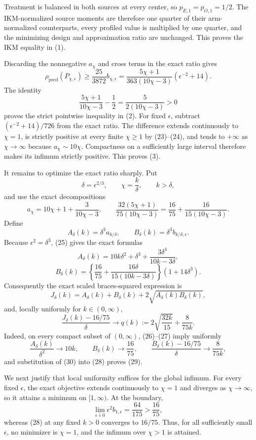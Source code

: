 Treatment is balanced in both sources at every center, so \(p_{E,1}=p_{O,1}=1/2\). The IKM-normalized source moments are therefore one quarter of their arm-normalized counterparts, every profiled value is multiplied by one quarter, and the minimizing design and approximation ratio are unchanged. This proves the IKM equality in (1).

Discarding the nonnegative \(a_\chi\) and cross terms in the exact ratio gives
\[
 \rho_{\mathrm{pred}}(P_{\chi,\epsilon})
 \ge \frac{25}{3872}b_{\chi,\epsilon}
 =\frac{5\chi+1}{363(10\chi-3)}(\epsilon^{-2}+14).     \tag{23}
\]
The identity
\[
 \frac{5\chi+1}{10\chi-3}-\frac12
 =\frac5{2(10\chi-3)}>0                                \tag{24}
\]
proves the strict pointwise inequality in (2). For fixed \(\epsilon\), subtract \((\epsilon^{-2}+14)/726\) from the exact ratio. The difference extends continuously to \(\chi=1\), is strictly positive at every finite \(\chi\ge1\) by (23)--(24), and tends to \(+\infty\) as \(\chi\to\infty\) because \(a_\chi\sim10\chi\). Compactness on a sufficiently large interval therefore makes its infimum strictly positive. This proves (3).

It remains to optimize the exact ratio sharply. Put
\[
 \delta=\epsilon^{2/3},\qquad \chi=\frac{k}{\delta},
 \qquad k>\delta,
\]
and use the exact decompositions
\[
 a_\chi=10\chi+1+\frac3{10\chi-3},
 \qquad
 \frac{32(5\chi+1)}{75(10\chi-3)}
 =\frac{16}{75}+\frac{16}{15(10\chi-3)}.              \tag{25}
\]
Define
\[
 A_\delta(k)=\delta^3a_{k/\delta},
 \qquad B_\delta(k)=\delta^3b_{k/\delta,\epsilon}.
\]
Because \(\epsilon^2=\delta^3\), (25) gives the exact formulas
\[
 A_\delta(k)
 =10k\delta^2+\delta^3+\frac{3\delta^4}{10k-3\delta}, \tag{26}
\]
\[
 B_\delta(k)
 =\left\{\frac{16}{75}
 +\frac{16\delta}{15(10k-3\delta)}\right\}
 (1+14\delta^3).                                      \tag{27}
\]
Consequently the exact scaled braces-squared expression is
\[
 J_\delta(k)=A_\delta(k)+B_\delta(k)
 +2\sqrt{A_\delta(k)B_\delta(k)},                     \tag{28}
\]
and, locally uniformly for \(k\in(0,\infty)\),
\[
 \frac{J_\delta(k)-16/75}{\delta}
 \longrightarrow
 q(k):=2\sqrt{\frac{32k}{15}}+\frac{8}{75k}.          \tag{29}
\]
Indeed, on every compact subset of \((0,\infty)\), (26)--(27) imply uniformly
\[
 \frac{A_\delta(k)}{\delta^2}\longrightarrow10k,
 \qquad
 B_\delta(k)\longrightarrow\frac{16}{75},
 \qquad
 \frac{B_\delta(k)-16/75}{\delta}
 \longrightarrow\frac{8}{75k},                       \tag{30}
\]
and substitution of (30) into (28) proves (29).

We next justify that local uniformity suffices for the global infimum. For every fixed \(\epsilon\), the exact objective extends continuously to \(\chi=1\) and diverges as \(\chi\to\infty\), so it attains a minimum on \([1,\infty)\). At the boundary,
\[
 \lim_{\epsilon\downarrow0}\epsilon^2b_{1,\epsilon}
 =\frac{64}{175}>\frac{16}{75},                        \tag{31}
\]
whereas (28) at any fixed \(k>0\) converges to \(16/75\). Thus, for all sufficiently small \(\epsilon\), no minimizer is \(\chi=1\), and the infimum over \(\chi>1\) is attained.

